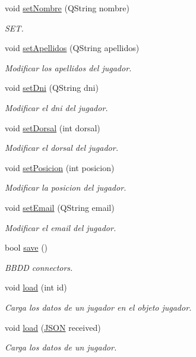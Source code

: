 \begin{DoxyCompactItemize}
void \mbox{\hyperlink{classJugador_a66ae18a593fe618962a7c78fa201712a}{set\+Nombre}} (Q\+String nombre)
\begin{DoxyCompactList}\small\item\em S\+ET. \end{DoxyCompactList}\item 
void \mbox{\hyperlink{classJugador_ad272be7c6b113eee1c9baf1262c4ad95}{set\+Apellidos}} (Q\+String apellidos)
\begin{DoxyCompactList}\small\item\em Modificar los apellidos del jugador. \end{DoxyCompactList}\item 
void \mbox{\hyperlink{classJugador_af2b5ddb5d0b2cc80867ba54cf4cea564}{set\+Dni}} (Q\+String dni)
\begin{DoxyCompactList}\small\item\em Modificar el dni del jugador. \end{DoxyCompactList}\item 
void \mbox{\hyperlink{classJugador_a08e9a676f4710c0635d02e129d7cb7d0}{set\+Dorsal}} (int dorsal)
\begin{DoxyCompactList}\small\item\em Modificar el dorsal del jugador. \end{DoxyCompactList}\item 
void \mbox{\hyperlink{classJugador_a0b56f6473a446c7dd2c649dfc2d7cdea}{set\+Posicion}} (int posicion)
\begin{DoxyCompactList}\small\item\em Modificar la posicion del jugador. \end{DoxyCompactList}\item 
void \mbox{\hyperlink{classJugador_abe37872318ab13c0b6043302eb31082c}{set\+Email}} (Q\+String email)
\begin{DoxyCompactList}\small\item\em Modificar el email del jugador. \end{DoxyCompactList}\item 
bool \mbox{\hyperlink{classJugador_a259600a922dca782041b65d3a35220ae}{save}} ()
\begin{DoxyCompactList}\small\item\em B\+B\+DD connectors. \end{DoxyCompactList}\item 
void \mbox{\hyperlink{classJugador_a500d0e508636a711ae941b7557641c1a}{load}} (int id)
\begin{DoxyCompactList}\small\item\em Carga los datos de un jugador en el objeto jugador. \end{DoxyCompactList}\item 
void \mbox{\hyperlink{classJugador_ae2da8cec1afc1c566872dcc27f41e955}{load}} (\mbox{\hyperlink{jugador_8h_ab6104b89642419db4e355b7b2e40abbe}{J\+S\+ON}} received)
\begin{DoxyCompactList}\small\item\em Carga los datos de un jugador. \end{DoxyCompactList}\end{DoxyCompactItemize}


